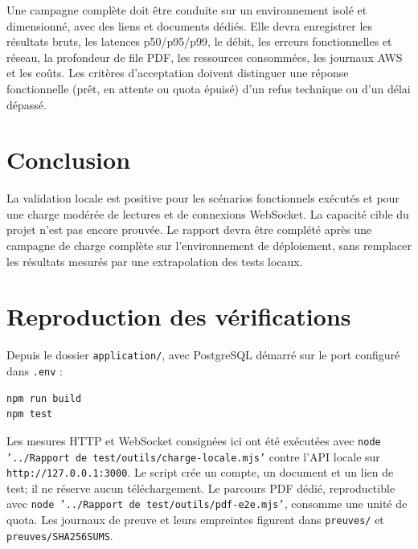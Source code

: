 \documentclass[11pt,a4paper,oneside]{report}
\begin{document}
Une campagne complète doit être conduite sur un environnement isolé et dimensionné, avec des liens et documents dédiés. Elle devra enregistrer les résultats bruts, les latences p50/p95/p99, le débit, les erreurs fonctionnelles et réseau, la profondeur de file PDF, les ressources consommées, les journaux AWS et les coûts. Les critères d’acceptation doivent distinguer une réponse fonctionnelle (prêt, en attente ou quota épuisé) d’un refus technique ou d’un délai dépassé.

\chapter{Conclusion}
La validation locale est positive pour les scénarios fonctionnels exécutés et pour une charge modérée de lectures et de connexions WebSocket. La capacité cible du projet n’est pas encore prouvée. Le rapport devra être complété après une campagne de charge complète sur l’environnement de déploiement, sans remplacer les résultats mesurés par une extrapolation des tests locaux.

\appendix
\chapter{Reproduction des vérifications}
Depuis le dossier \texttt{application/}, avec PostgreSQL démarré sur le port configuré dans \texttt{.env} :
\begin{verbatim}
npm run build
npm test
\end{verbatim}
Les mesures HTTP et WebSocket consignées ici ont été exécutées avec \texttt{node '../Rapport de test/outils/charge-locale.mjs'} contre l’API locale sur \texttt{http://127.0.0.1:3000}. Le script crée un compte, un document et un lien de test; il ne réserve aucun téléchargement. Le parcours PDF dédié, reproductible avec \texttt{node '../Rapport de test/outils/pdf-e2e.mjs'}, consomme une unité de quota. Les journaux de preuve et leurs empreintes figurent dans \texttt{preuves/} et \texttt{preuves/SHA256SUMS}.
\end{document}
